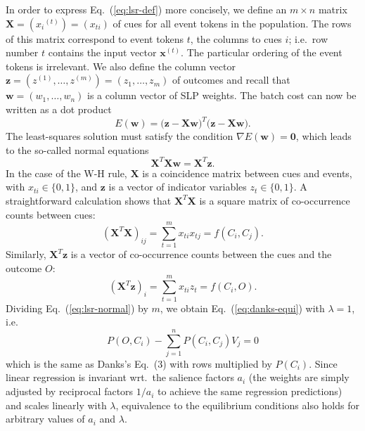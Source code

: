 \documentclass[conference]{IEEEtran}
\newcommand{\psup}[1]{\ensuremath{^{(#1)}}}
\newcommand{\psupt}{\psup{t}}
\begin{document}
In order to express Eq.~(\ref{eq:lsr-def}) more concisely, we define an $m\times n$ matrix $\mathbf{X} = (x_i\psupt) = (x_{ti})$ of cues for all event tokens in the population.  The rows of this matrix correspond to event tokens $t$, the columns to cues $i$; i.e.\ row number $t$ contains the input vector $\mathbf{x}\psupt$.  The particular ordering of the event tokens is irrelevant.  We also define the column vector $\mathbf{z} = (z\psup{1}, \ldots, z\psup{m}) = (z_1, \ldots, z_m)$ of outcomes and recall that $\mathbf{w} = (w_1, \ldots, w_n)$ is a column vector of SLP weights.  The batch cost can now be written as a dot product
\begin{equation}
  \label{eq:lsr-matrix}
  E(\mathbf{w}) = \bigl( \mathbf{z} - \mathbf{X} \mathbf{w} \bigr)^T \bigl( \mathbf{z} - \mathbf{X} \mathbf{w} \bigr) .
\end{equation}
The least-squares solution must satisfy the condition $\nabla E(\mathbf{w}) = \mathbf{0}$, which leads to the so-called normal equations \cite[p.\ 142]{bishop2006}
\begin{equation}
  \label{eq:lsr-normal}
  \mathbf{X}^T \mathbf{X} \mathbf{w} = \mathbf{X}^T \mathbf{z} .
\end{equation}
In the case of the W-H rule, $\mathbf{X}$ is a coincidence matrix between cues and events, with $x_{ti} \in \{0, 1\}$, and $\mathbf{z}$ is a vector of indicator variables $z_t \in \{0, 1\}$.  A straightforward calculation shows that $\mathbf{X}^T \mathbf{X}$ is a square matrix of co-occurrence counts between cues:
\[
(\mathbf{X}^T \mathbf{X})_{ij} = \sum_{t=1}^m x_{ti} x_{tj} = f(C_i, C_j) .
\]
Similarly, $\mathbf{X}^T \mathbf{z}$ is a vector of co-occurrence counts between the cues and the outcome $O$:
\[
(\mathbf{X}^T \mathbf{z})_i = \sum_{t=1}^m x_{ti} z_t = f(C_i, O) .
\]
Dividing Eq.~(\ref{eq:lsr-normal}) by $m$, we obtain Eq.~(\ref{eq:danks-equi}) with $\lambda = 1$, i.e.
\[
P(O, C_i) - \sum_{j=1}^n P(C_i, C_j) V_j = 0
\]
which is the same as Danks's Eq.~(3) \cite[p.\ 112]{danks2003} with rows multiplied by $P(C_i)$.  Since linear regression is invariant wrt.\ the salience factors $a_i$ (the weights are simply adjusted by reciprocal factors $1 / a_i$ to achieve the same regression predictions) and scales linearly with $\lambda$, equivalence to the equilibrium conditions \cite[pp.\ 112--114]{danks2003} also holds for arbitrary values of $a_i$ and $\lambda$.
\end{document}

